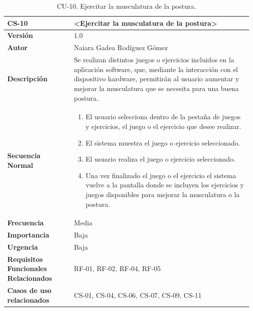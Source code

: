 \begin{table}[h!]
\centering
\begin{tabular}{ |m{3cm}|m{11cm}|  } 
\hline
\cellcolor[HTML]{B9E3F0}\textbf{CS-10} & \cellcolor[HTML]{B9E3F0}\textbf{<Ejercitar la musculatura de la postura>}\\

\hline
\cellcolor[HTML]{EFEFEF}\textbf{Versión}             & 1.0  \\
\hline
\cellcolor[HTML]{EFEFEF}\textbf{Autor}                & Naiara Gadea Rodíguez Gómez\\
\hline
\cellcolor[HTML]{EFEFEF}\textbf{Descripción}                & {Se realizan distintos juegos o ejercicios incluidos en la aplicación software, que, mediante la interacción con el dispositivo hardware, permitirán al usuario aumentar y mejorar la musculatura que se necesita para una buena postura. }\\
\hline
\cellcolor[HTML]{EFEFEF}\textbf{Secuencia \newline Normal}                &                 
        \begin{enumerate}
			\def\labelenumi{\arabic{enumi}.}
			\tightlist
			\item El usuario selecciona dentro de la pestaña de juegos y ejercicios, el juego o el ejercicio que desee realizar. 
			\item El sistema muestra el juego o ejercicio seleccionado. 
                \item El usuario realiza el juego o ejercicio seleccionado. 
                \item Una vez finalizado el juego o el ejercicio el sistema vuelve a la pantalla donde se incluyen los ejercicios y juegos disponibles para mejorar la musculatura o la postura. 
		\end{enumerate}\\
\hline
\cellcolor[HTML]{EFEFEF}\textbf{Frecuencia}                & Media\\
\hline
\cellcolor[HTML]{EFEFEF}\textbf{Importancia}                & Baja\\
\hline
\cellcolor[HTML]{EFEFEF}\textbf{Urgencia}                & Baja\\
\hline
\cellcolor[HTML]{EFEFEF}\textbf{Requisitos Funcionales Relacionados}                & {RF-01, RF-02, RF-04, RF-05 }\\
\hline
\cellcolor[HTML]{EFEFEF}\textbf{Casos de uso relacionados}                & {CS-01, CS-04, CS-06, CS-07, CS-09, CS-11}\\
\hline
\end{tabular}
\caption{CU-10. Ejercitar la musculatura de la postura.}
\end{table}

